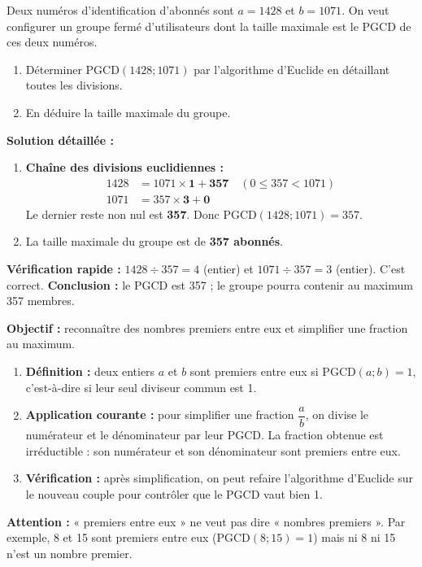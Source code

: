 \documentclass[11pt]{article}
\newcommand{\cle}[1]{{\popxbold\color{popdark}#1}}
\begin{document}
\begin{exoresolu}
Deux numéros d'identification d'abonnés sont $a = 1428$ et $b = 1071$. On veut configurer un groupe fermé d'utilisateurs dont la taille maximale est le PGCD de ces deux numéros.
\begin{enumerate}
    \item Déterminer $\text{PGCD}(1428; 1071)$ par l'algorithme d'Euclide en détaillant toutes les divisions.
    \item En déduire la taille maximale du groupe.
\end{enumerate}
\tcblower
\textbf{Solution détaillée :}
\begin{enumerate}
    \item \textbf{Chaîne des divisions euclidiennes :}
    \begin{align*}
    1428 &= 1071 \times \mathbf{1} + \mathbf{357} \quad (0 \le 357 < 1071) \\
    1071 &= 357 \times \mathbf{3} + \mathbf{0}
    \end{align*}
    Le dernier reste non nul est \textbf{357}.
    Donc $\text{PGCD}(1428; 1071) = 357$.
    \item La taille maximale du groupe est de \textbf{357 abonnés}.
\end{enumerate}
\textbf{Vérification rapide :} $1428 \div 357 = 4$ (entier) et $1071 \div 357 = 3$ (entier). C'est correct.
\textbf{Conclusion :} le PGCD est 357 ; le groupe pourra contenir au maximum 357 membres.
\end{exoresolu}

\begin{methode}
\textbf{Objectif :} reconnaître des nombres premiers entre eux et simplifier une fraction au maximum.
\begin{enumerate}
    \item \textbf{Définition :} deux entiers $a$ et $b$ sont \cle{premiers entre eux} si $\text{PGCD}(a; b) = 1$, c'est-à-dire si leur seul diviseur commun est 1.
    \item \textbf{Application courante :} pour simplifier une fraction $\dfrac{a}{b}$, on divise le numérateur et le dénominateur par leur PGCD. La fraction obtenue est \cle{irréductible} : son numérateur et son dénominateur sont premiers entre eux.
    \item \textbf{Vérification :} après simplification, on peut refaire l'algorithme d'Euclide sur le nouveau couple pour contrôler que le PGCD vaut bien 1.
\end{enumerate}
\textbf{Attention :} « premiers entre eux » ne veut pas dire « nombres premiers ». Par exemple, 8 et 15 sont premiers entre eux ($\text{PGCD}(8;15)=1$) mais ni 8 ni 15 n'est un nombre premier.
\end{methode}
\end{document}
